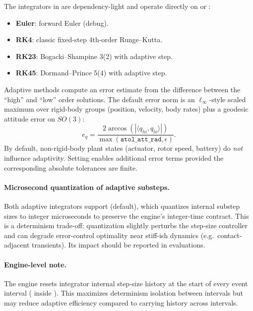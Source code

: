 The integrators in  are dependency-light and operate directly on  or :
\begin{itemize}[leftmargin=*,itemsep=2pt]
  \item \textbf{Euler}: forward Euler (debug).
  \item \textbf{RK4}: classic fixed-step 4th-order Runge--Kutta.
  \item \textbf{RK23}: Bogacki--Shampine 3(2) with adaptive step.
  \item \textbf{RK45}: Dormand--Prince 5(4) with adaptive step.
\end{itemize}

Adaptive methods compute an error estimate from the difference between the ``high'' and ``low'' order solutions. The default error norm is an $\ell_\infty$-style scaled maximum over rigid-body groups (position, velocity, body rates) plus a geodesic attitude error on $SO(3)$:
\begin{equation}
  e_q = \frac{2\arccos(|\langle q_{hi}, q_{lo}\rangle|)}{\max(\mathtt{atol\_att\_rad},\epsilon)}.
\end{equation}
By default, non-rigid-body plant states (actuator, rotor speed, battery) do \emph{not} influence adaptivity. Setting  enables additional error terms provided the corresponding absolute tolerances are finite.

\paragraph{Microsecond quantization of adaptive substeps.}
Both adaptive integrators support  (default), which quantizes internal substep sizes to integer microseconds to preserve the engine's integer-time contract. This is a determinism trade-off: quantization slightly perturbs the step-size controller and can degrade error-control optimality near stiff-ish dynamics (e.g.\ contact-adjacent transients). Its impact should be reported in evaluations.

\paragraph{Engine-level note.}
The engine resets integrator internal step-size history at the start of every event interval ( inside ). This maximizes determinism isolation between intervals but may reduce adaptive efficiency compared to carrying history across intervals.


